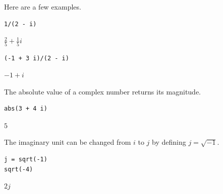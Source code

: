 Here are a few examples.

{\color{blue}
\begin{verbatim}
1/(2 - i)
\end{verbatim}
}

$\displaystyle \tfrac{2}{5}+\tfrac{1}{5}i$

{\color{blue}
\begin{verbatim}
(-1 + 3 i)/(2 - i)
\end{verbatim}
}

$\displaystyle -1+i$

\bigskip

The absolute value of a complex number returns its magnitude.

{\color{blue}
\begin{verbatim}
abs(3 + 4 i)
\end{verbatim}
}

$\displaystyle 5$

\bigskip

The imaginary unit can be changed from $i$ to $j$
by defining $j=\sqrt{-1}$.

{\color{blue}
\begin{verbatim}
j = sqrt(-1)
sqrt(-4)
\end{verbatim}
}

$\displaystyle 2j$


